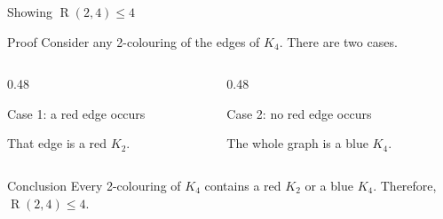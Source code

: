\documentclass[aspectratio=169,11pt]{beamer}
\newcommand{\Ram}{\operatorname{R}}
\begin{document}
\begin{frame}[t]{Showing $\Ram(2,4)\le 4$}
\vspace{0.10cm}

\begin{block}{Proof}
\large
Consider any 2-colouring of the edges of $K_4$. There are two cases.
\end{block}

\vspace{0.10cm}

\begin{columns}[T,onlytextwidth]
  \begin{column}{0.48\textwidth}
    \begin{block}{Case 1: a red edge occurs}
      \centering

      \vspace{0.04cm}
      \textcolor{RamRed}{That edge is a red $K_2$.}
    \end{block}
  \end{column}
  \begin{column}{0.48\textwidth}
    \begin{block}{Case 2: no red edge occurs}
      \centering

      \vspace{0.04cm}
      \textcolor{RamBlue}{The whole graph is a blue $K_4$.}
    \end{block}
  \end{column}
\end{columns}

\vspace{0.12cm}

\begin{alertblock}{Conclusion}
\large
Every 2-colouring of $K_4$ contains a red $K_2$ or a blue $K_4$.
Therefore, $\Ram(2,4)\le 4$.
\end{alertblock}
\end{frame}
\end{document}
